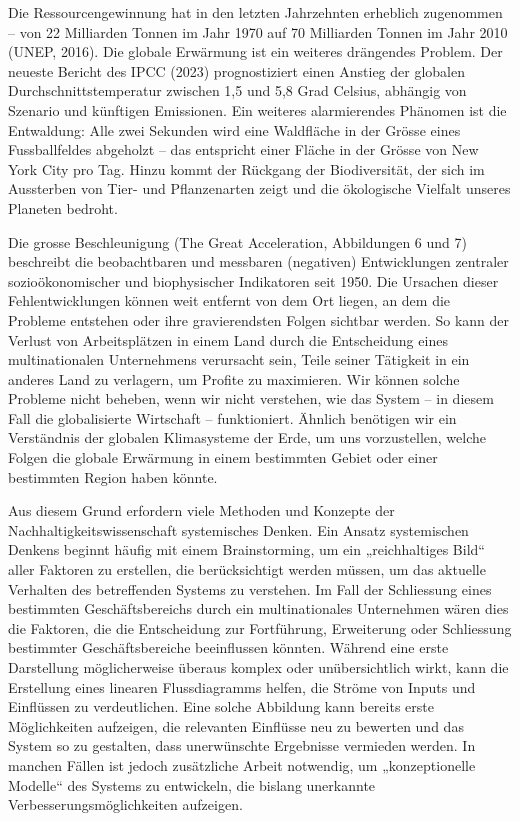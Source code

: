 \documentclass[
  letterpaper,
  DIV=11,
  numbers=noendperiod]{scrartcl}
\begin{document}
Die Ressourcengewinnung hat in den letzten Jahrzehnten erheblich
zugenommen -- von 22 Milliarden Tonnen im Jahr 1970 auf 70 Milliarden
Tonnen im Jahr 2010 (UNEP, 2016). Die globale Erwärmung ist ein weiteres
drängendes Problem. Der neueste Bericht des IPCC (2023) prognostiziert
einen Anstieg der globalen Durchschnittstemperatur zwischen 1,5 und 5,8
Grad Celsius, abhängig von Szenario und künftigen Emissionen. Ein
weiteres alarmierendes Phänomen ist die Entwaldung: Alle zwei Sekunden
wird eine Waldfläche in der Grösse eines Fussballfeldes abgeholzt -- das
entspricht einer Fläche in der Grösse von New York City pro Tag. Hinzu
kommt der Rückgang der Biodiversität, der sich im Aussterben von Tier-
und Pflanzenarten zeigt und die ökologische Vielfalt unseres Planeten
bedroht.

Die grosse Beschleunigung (The Great Acceleration, Abbildungen 6 und 7)
beschreibt die beobachtbaren und messbaren (negativen) Entwicklungen
zentraler sozioökonomischer und biophysischer Indikatoren seit 1950. Die
Ursachen dieser Fehlentwicklungen können weit entfernt von dem Ort
liegen, an dem die Probleme entstehen oder ihre gravierendsten Folgen
sichtbar werden. So kann der Verlust von Arbeitsplätzen in einem Land
durch die Entscheidung eines multinationalen Unternehmens verursacht
sein, Teile seiner Tätigkeit in ein anderes Land zu verlagern, um
Profite zu maximieren. Wir können solche Probleme nicht beheben, wenn
wir nicht verstehen, wie das System -- in diesem Fall die globalisierte
Wirtschaft -- funktioniert. Ähnlich benötigen wir ein Verständnis der
globalen Klimasysteme der Erde, um uns vorzustellen, welche Folgen die
globale Erwärmung in einem bestimmten Gebiet oder einer bestimmten
Region haben könnte.

Aus diesem Grund erfordern viele Methoden und Konzepte der
Nachhaltigkeitswissenschaft systemisches Denken. Ein Ansatz systemischen
Denkens beginnt häufig mit einem Brainstorming, um ein „reichhaltiges
Bild`` aller Faktoren zu erstellen, die berücksichtigt werden müssen, um
das aktuelle Verhalten des betreffenden Systems zu verstehen. Im Fall
der Schliessung eines bestimmten Geschäftsbereichs durch ein
multinationales Unternehmen wären dies die Faktoren, die die
Entscheidung zur Fortführung, Erweiterung oder Schliessung bestimmter
Geschäftsbereiche beeinflussen könnten. Während eine erste Darstellung
möglicherweise überaus komplex oder unübersichtlich wirkt, kann die
Erstellung eines linearen Flussdiagramms helfen, die Ströme von Inputs
und Einflüssen zu verdeutlichen. Eine solche Abbildung kann bereits
erste Möglichkeiten aufzeigen, die relevanten Einflüsse neu zu bewerten
und das System so zu gestalten, dass unerwünschte Ergebnisse vermieden
werden. In manchen Fällen ist jedoch zusätzliche Arbeit notwendig, um
„konzeptionelle Modelle`` des Systems zu entwickeln, die bislang
unerkannte Verbesserungsmöglichkeiten aufzeigen.
\end{document}
